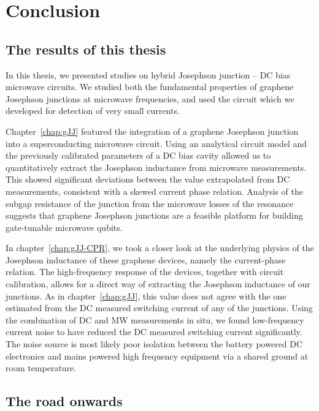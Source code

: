 \newchapstyle
\chapter{Conclusion}
\label{chap:conclusion}

\afterpage{\pagecolor{none}}\newpage

\section{The results of this thesis}
In this thesis, we presented studies on hybrid Josephson junction -- DC bias microwave circuits.
%
We studied both the fundamental properties of graphene Josephson junctions at microwave frequencies, and used the circuit which we developed for detection of very small currents.

Chapter~\ref{chap:gJJ} featured the integration of a graphene Josephson junction into a superconducting microwave circuit.
%
Using an analytical circuit model and the previously calibrated parameters of a DC bias cavity allowed us to quantitatively extract the Josephson inductance from microwave measurements.
%
This showed significant deviations between the value extrapolated from DC measurements, consistent with a skewed current phase relation.
%
Analysis of the subgap resistance of the junction from the microwave losses of the resonance suggests that graphene Josephson junctions are a feasible platform for building gate-tunable microwave qubits.

In chapter~\ref{chap:gJJ-CPR}, we took a closer look at the underlying physics of the Josephson inductance of these graphene devices, namely the current-phase relation.
%
The high-frequency response of the devices, together with circuit calibration, allows for a direct way of extracting the Josephson inductance of our junctions.
%
As in chapter~\ref{chap:gJJ}, this value does not agree with the one estimated from the DC measured switching current of any of the junctions.
%
Using the combination of DC and MW measurements in situ, we found low-frequency current noise to have reduced the DC measured switching current significantly.
%
The noise source is most likely poor isolation between the battery powered DC electronics and mains powered high frequency equipment via a shared ground at room temperature.
%

\section{The road onwards}

